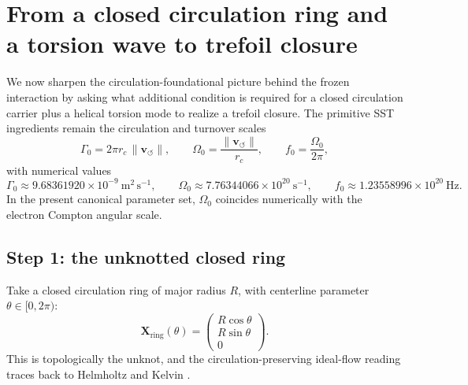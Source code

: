 \documentclass[11pt,a4paper]{article}
\begin{document}
    \section{From a closed circulation ring and a torsion wave to trefoil closure}
    \label{sec:ring-to-trefoil}
    
    We now sharpen the circulation-foundational picture behind the frozen interaction by asking what additional condition is required for a closed circulation carrier plus a helical torsion mode to realize a trefoil closure. The primitive SST ingredients remain the circulation and turnover scales
    \begin{equation}
        \Gamma_0 = 2\pi r_c\,\lVert \mathbf{v}_{\!\boldsymbol{\circlearrowleft}}\rVert,
        \qquad
        \Omega_0 = \frac{\lVert \mathbf{v}_{\!\boldsymbol{\circlearrowleft}}\rVert}{r_c},
        \qquad
        f_0 = \frac{\Omega_0}{2\pi},
        \label{eq:Gamma0Omega0Trefoil}
    \end{equation}
    with numerical values
    \begin{equation}
        \Gamma_0 \approx 9.68361920\times 10^{-9}\ \mathrm{m^2\,s^{-1}},
        \qquad
        \Omega_0 \approx 7.76344066\times 10^{20}\ \mathrm{s^{-1}},
        \qquad
        f_0 \approx 1.23558996\times 10^{20}\ \mathrm{Hz}.
        \label{eq:Gamma0Omega0TrefoilNum}
    \end{equation}
    In the present canonical parameter set, \(\Omega_0\) coincides numerically with the electron Compton angular scale.
    
    \subsection{Step 1: the unknotted closed ring}
        Take a closed circulation ring of major radius \(R\), with centerline parameter \(\theta\in[0,2\pi)\):
        \begin{equation}
            \mathbf{X}_{\mathrm{ring}}(\theta)
            =
            \begin{pmatrix}
                R\cos\theta\\
                R\sin\theta\\
                0
            \end{pmatrix}.
            \label{eq:ringcenterlineTrefoil}
        \end{equation}
        This is topologically the unknot, and the circulation-preserving ideal-flow reading traces back to Helmholtz and Kelvin \cite{Helmholtz1858,Kelvin1869}.
    
\end{document}
